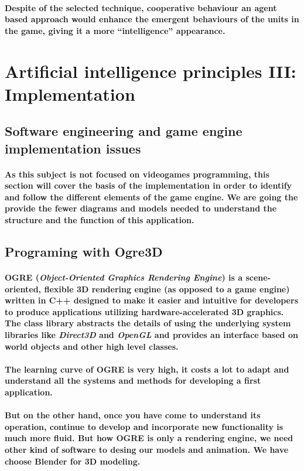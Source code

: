 \documentclass[a4paper,10pt]{article}
\newcommand{\p}[1]{\paragraph{\indent\textnormal{#1}}}
\begin{document}
      \p{Despite of the selected technique, cooperative behaviour an agent based approach would enhance the emergent behaviours of the units in the game, giving it a more ``intelligence'' appearance.}

\newpage
\section{Artificial intelligence principles III: Implementation}

  \subsection{Software engineering and game engine implementation issues}

    \p{As this subject is not focused on videogames programming, this section will cover the basis of the implementation in order to identify and follow the different elements of the game engine. We are going the provide the fewer diagrams and models needed to understand the structure and the function of this application.}


  \subsection{Programing with Ogre3D}

    \p{\textbf{OGRE} (\textit{Object-Oriented Graphics Rendering Engine}) is a scene-oriented, flexible 3D rendering engine (as opposed to a game engine) written in \textbf{C++} designed to make it easier and intuitive for developers to produce applications utilizing hardware-accelerated 3D graphics. The class library abstracts the details of using the underlying system libraries like \textit{Direct3D} and \textit{OpenGL} and provides an interface based on world objects and other high level classes.}

    \p{The learning curve of OGRE is very high, it costs a lot to adapt and understand all the systems and methods for developing a first application.}

    \p{But on the other hand, once you have come to understand its operation, continue to develop and incorporate new functionality is much more fluid. But how OGRE is only a rendering engine, we need other kind of software to desing our models and animation. We have choose Blender for 3D modeling.}
\end{document}
